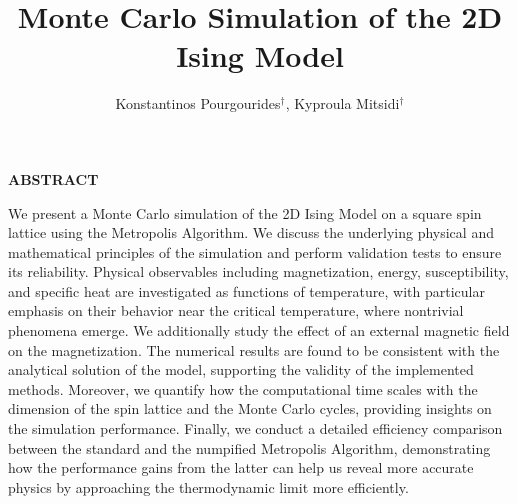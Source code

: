 \documentclass{article}
\title{\textbf{Monte Carlo Simulation of the 2D Ising Model}}
\author{Konstantinos Pourgourides$^{\dagger}$, Kyproula Mitsidi$^{\dagger}$}
\affil{\small $\dagger$ Faculty of Applied Sciences, Delft University of Technology, Lorentzweg 1, 2628 CK, Delft, The Netherlands}
\date{}
\begin{document}
\maketitle
\vspace{-2.5em}
\begin{center}
\textbf{ABSTRACT}\\
\vspace{0.7\baselineskip}
\begin{minipage}{0.8\textwidth}

We present a Monte Carlo simulation of the 2D Ising Model
on a square spin lattice using the Metropolis Algorithm. We discuss the underlying physical and mathematical principles of the simulation and perform validation tests to ensure its reliability. Physical observables including magnetization, energy, susceptibility, and specific heat are investigated as functions of temperature, with particular emphasis on their behavior near the critical temperature, where nontrivial phenomena emerge. We additionally study the effect of an external magnetic field on the magnetization. The numerical results are found to be consistent with the analytical solution of the model, supporting the validity of the implemented methods. Moreover, we quantify how the computational time scales with the dimension of the spin lattice and the Monte Carlo cycles, providing insights on the simulation performance. Finally, we conduct a detailed efficiency comparison between the standard and the numpified Metropolis Algorithm, demonstrating how the performance gains from the latter can help us reveal more accurate physics by approaching the thermodynamic limit more efficiently.

\end{minipage}
\end{center}
\vspace{0.5\baselineskip}
\end{document}
